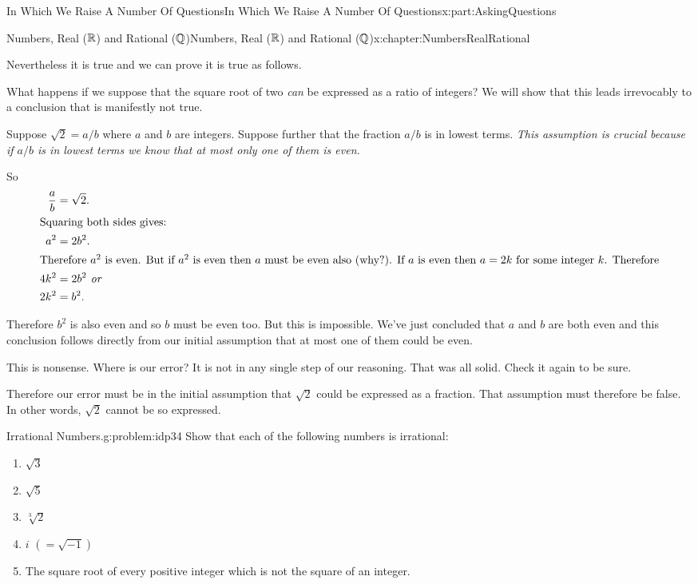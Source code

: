 \begin{partptx}{In Which We Raise A Number Of Questions}{}{In Which We Raise A Number Of Questions}{}{}{x:part:AskingQuestions}
\begin{chapterptx}{Numbers, Real (\(\mathbb {R}\)) and Rational (\(\mathbb {Q}\))}{}{Numbers, Real (\(\mathbb {R}\)) and Rational (\(\mathbb {Q}\))}{}{}{x:chapter:NumbersRealRational}
\begin{introduction}{}
			\par
			Nevertheless it is true and we can prove it is true as follows.%
			\par
			What happens if we suppose that the square root of two \emph{can} be expressed as a ratio of integers? We will show that this leads irrevocably to a conclusion that is manifestly not true.%
			\par
			Suppose \(\sqrt{2}=a/b\) where \(a\) and \(b\) are integers. Suppose further that the fraction \(a/b\) is in lowest terms. \emph{This assumption is crucial because if \(a/b\) is in lowest terms we know that at most only one of them is even.}%
			\par
			So%
			\begin{align*}
				\frac{a}{b} & = \sqrt{2}.\\
				\intertext{Squaring both sides gives:}
				a^2 & = 2b^2.\\
				\intertext{Therefore \(a^2\) is even. But if \(a^2\) is even then \(a\) must be even also (why?). If \(a\) is even then \(a=2k\) for some integer \(k\). Therefore}
				4k^2& =2b^2\textit{ or}\\
				2k^2& = b^2\text{.}
			\end{align*}
			\par
			Therefore \(b^2\) is also even and so \(b\) must be even too. But this is impossible. We've just concluded that \(a\) and \(b\) are both even and this conclusion follows directly from our initial assumption that at most one of them could be even.%
			\par
			This is nonsense. Where is our error? It is not in any single step of our reasoning. That was all solid. Check it again to be sure.%
			\par
			Therefore our error must be in the initial assumption that \(\sqrt{2}\) could be expressed as a fraction. That assumption must therefore be false. In other words, \(\sqrt{2}\) cannot be so expressed.%
			\begin{problem}{Irrational Numbers.}{g:problem:idp34}%
				Show that each of the following numbers is irrational:%
				\begin{enumerate}[font=\bfseries,label=(\alph*),ref=\alph*]
					\item{}\(\sqrt{3}\)%
					\item{}\(\sqrt{5}\)%
					\item{}\(\sqrt[3]{2}\)%
					\item{}\(i\) \((=\sqrt{-1})\)%
					\item{}The square root of every positive integer which is not the square of an integer.%

\end{enumerate}
\end{problem}
\end{introduction}
\end{chapterptx}
\end{partptx}
